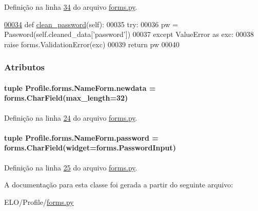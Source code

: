 Definição na linha \hyperlink{Profile_2forms_8py_source_l00034}{34} do arquivo \hyperlink{Profile_2forms_8py_source}{forms.\+py}.


\begin{DoxyCode}
\hypertarget{classProfile_1_1forms_1_1NameForm_l00034}{}\hyperlink{classProfile_1_1forms_1_1NameForm_aa4cc0c75c2f47602302780502b7c20a0}{00034}     \textcolor{keyword}{def }\hyperlink{classProfile_1_1forms_1_1NameForm_aa4cc0c75c2f47602302780502b7c20a0}{clean\_password}(self):
00035         \textcolor{keywordflow}{try}:
00036             pw = Password(self.cleaned\_data[\textcolor{stringliteral}{'password'}])
00037         \textcolor{keywordflow}{except} ValueError \textcolor{keyword}{as} exc:
00038             \textcolor{keywordflow}{raise} forms.ValidationError(exc)
00039         \textcolor{keywordflow}{return} pw
00040 
\end{DoxyCode}


\subsubsection{Atributos}
\hypertarget{classProfile_1_1forms_1_1NameForm_a6ebfb316b263c162dd3895b1da149eda}{}
\paragraph[{newdata}]{\setlength{\rightskip}{0pt plus 5cm}tuple Profile.\+forms.\+Name\+Form.\+newdata = forms.\+Char\+Field(max\+\_\+length=32)\hspace{0.3cm}{\ttfamily [static]}}\label{classProfile_1_1forms_1_1NameForm_a6ebfb316b263c162dd3895b1da149eda}


Definição na linha \hyperlink{Profile_2forms_8py_source_l00024}{24} do arquivo \hyperlink{Profile_2forms_8py_source}{forms.\+py}.

\hypertarget{classProfile_1_1forms_1_1NameForm_a5a6959db0132c607a56f9cda75769ecf}{}
\paragraph[{password}]{\setlength{\rightskip}{0pt plus 5cm}tuple Profile.\+forms.\+Name\+Form.\+password = forms.\+Char\+Field(widget=forms.\+Password\+Input)\hspace{0.3cm}{\ttfamily [static]}}\label{classProfile_1_1forms_1_1NameForm_a5a6959db0132c607a56f9cda75769ecf}


Definição na linha \hyperlink{Profile_2forms_8py_source_l00025}{25} do arquivo \hyperlink{Profile_2forms_8py_source}{forms.\+py}.



A documentação para esta classe foi gerada a partir do seguinte arquivo\+:\begin{DoxyCompactItemize}
\item 
E\+L\+O/\+Profile/\hyperlink{Profile_2forms_8py}{forms.\+py}\end{DoxyCompactItemize}
